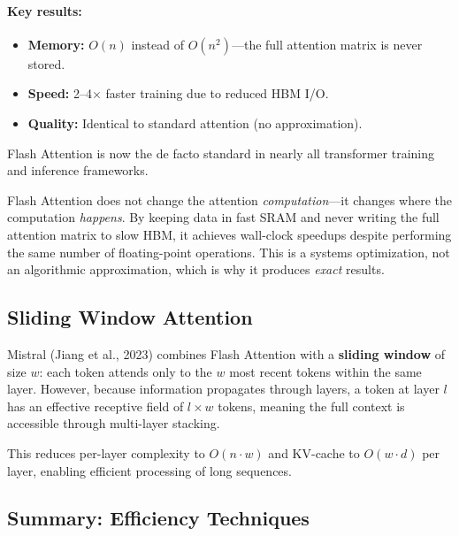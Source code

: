 \paragraph{Key results:}
\begin{itemize}
    \item \textbf{Memory:} $O(n)$ instead of $O(n^2)$---the full attention
          matrix is never stored.
    \item \textbf{Speed:} 2--4$\times$ faster training due to reduced HBM
          I/O.
    \item \textbf{Quality:} Identical to standard attention (no approximation).
\end{itemize}

Flash Attention is now the de facto standard in nearly all transformer
training and inference frameworks.

\begin{keyinsight}
Flash Attention does not change the attention \emph{computation}---it changes
where the computation \emph{happens}.  By keeping data in fast SRAM and never
writing the full attention matrix to slow HBM, it achieves wall-clock speedups
despite performing the same number of floating-point operations.  This is a
systems optimization, not an algorithmic approximation, which is why it
produces \emph{exact} results.
\end{keyinsight}

\subsection{Sliding Window Attention}

Mistral (Jiang et al., 2023) combines Flash Attention with a \textbf{sliding
window} of size $w$: each token attends only to the $w$ most recent tokens
within the same layer.  However, because information propagates through layers,
a token at layer $l$ has an effective receptive field of $l \times w$ tokens,
meaning the full context is accessible through multi-layer stacking.

This reduces per-layer complexity to $O(n \cdot w)$ and KV-cache to
$O(w \cdot d)$ per layer, enabling efficient processing of long sequences.

\subsection{Summary: Efficiency Techniques}

